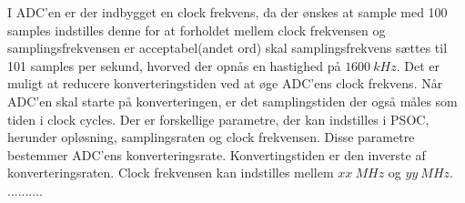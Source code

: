 I ADC'en er der indbygget en clock frekvens, da der ønskes at sample med 100 samples indstilles denne for at forholdet mellem clock frekvensen og samplingsfrekvensen er acceptabel(andet ord) skal samplingsfrekvens sættes til 101 samples per sekund, hvorved der opnås en hastighed på $1600~kHz$. Det er muligt at reducere konverteringstiden ved at øge ADC'ens clock frekvens. Når ADC'en skal starte på konverteringen, er det samplingstiden der også måles som tiden i clock cycles. Der er forskellige parametre, der kan indstilles i PSOC, herunder opløsning, samplingsraten og clock frekvensen. Disse parametre bestemmer ADC'ens konverteringsrate. Konvertingstiden er den inverste af konverteringsraten. Clock frekvensen kan indstilles mellem $xx~MHz$ og $yy~MHz$. ..........





































